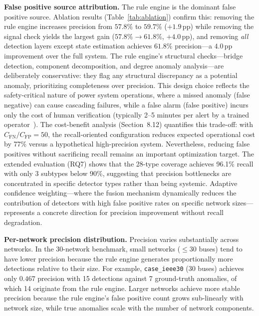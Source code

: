 \documentclass[research]{fcs}
\begin{document}
\textbf{False positive source attribution.} The rule engine is the dominant false positive source. Ablation results (Table~\ref{tab:ablation}) confirm this: removing the rule engine increases precision from $57.8\%$ to $59.7\%$ ($+1.9$\,pp) while removing the signal check yields the largest gain ($57.8\% \rightarrow 61.8\%$, $+4.0$\,pp), and removing \emph{all} detection layers except state estimation achieves $61.8\%$ precision---a $4.0$\,pp improvement over the full system. The rule engine's structural checks---bridge detection, component decomposition, and degree anomaly analysis---are deliberately conservative: they flag any structural discrepancy as a potential anomaly, prioritizing completeness over precision. This design choice reflects the safety-critical nature of power system operations, where a missed anomaly (false negative) can cause cascading failures, while a false alarm (false positive) incurs only the cost of human verification (typically 2--5 minutes per alert by a trained operator~\cite{abur2004power}). The cost-benefit analysis (Section~8.12) quantifies this trade-off: with $C_{\text{FN}}/C_{\text{FP}} = 50$, the recall-oriented configuration reduces expected operational cost by 77\% versus a hypothetical high-precision system. Nevertheless, reducing false positives without sacrificing recall remains an important optimization target. The extended evaluation (RQ7) shows that the 28-type coverage achieves 96.1\% recall with only 3 subtypes below 90\%, suggesting that precision bottlenecks are concentrated in specific detector types rather than being systemic. Adaptive confidence weighting---where the fusion mechanism dynamically reduces the contribution of detectors with high false positive rates on specific network sizes---represents a concrete direction for precision improvement without recall degradation.

\textbf{Per-network precision distribution.} Precision varies substantially across networks. In the 30-network benchmark, small networks ($\leq 30$ buses) tend to have lower precision because the rule engine generates proportionally more detections relative to their size. For example, \texttt{case\_ieee30} (30 buses) achieves only $0.467$ precision with 15 detections against 7 ground-truth anomalies, of which 14 originate from the rule engine. Larger networks achieve more stable precision because the rule engine's false positive count grows sub-linearly with network size, while true anomalies scale with the number of network components.
\end{document}
